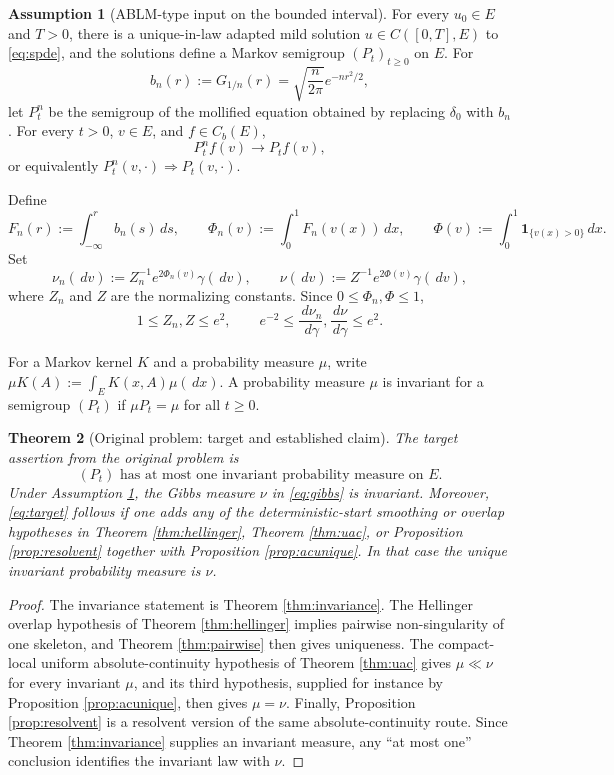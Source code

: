 \documentclass[12pt]{article}
\newcommand{\1}{\mathbf 1}
\newcommand{\dd}{\,d}
\theoremstyle{plain}
\newtheorem{theorem}{Theorem}[section]
\theoremstyle{definition}
\newtheorem{assumption}[theorem]{Assumption}
\theoremstyle{remark}
\numberwithin{equation}{section}
\begin{document}
\begin{assumption}[ABLM-type input on the bounded interval]\label{ass:ablm}
For every \(u_0\in E\) and \(T>0\), there is a unique-in-law adapted mild
solution \(u\in C([0,T],E)\) to \eqref{eq:spde}, and the solutions define a
Markov semigroup \((P_t)_{t\ge0}\) on \(E\).  For
\[
b_n(r):=G_{1/n}(r)=\sqrt{\frac n{2\pi}}e^{-nr^2/2},
\]
let \(P_t^n\) be the semigroup of the mollified equation obtained by replacing
\(\delta_0\) with \(b_n\).  For every \(t>0\), \(v\in E\), and \(f\in C_b(E)\),
\[
P_t^n f(v)\longrightarrow P_tf(v),
\]
or equivalently \(P_t^n(v,\cdot)\Rightarrow P_t(v,\cdot)\).
\end{assumption}

Define
\[
F_n(r):=\int_{-\infty}^r b_n(s)\dd s,\qquad
\Phi_n(v):=\int_0^1F_n(v(x))\dd x,\qquad
\Phi(v):=\int_0^1\1_{\{v(x)>0\}}\dd x.
\]
Set
\begin{equation}\label{eq:gibbs}
\nu_n(\dd v):=Z_n^{-1}e^{2\Phi_n(v)}\gamma(\dd v),
\qquad
\nu(\dd v):=Z^{-1}e^{2\Phi(v)}\gamma(\dd v),
\end{equation}
where \(Z_n\) and \(Z\) are the normalizing constants.  Since
\(0\le\Phi_n,\Phi\le1\),
\begin{equation}\label{eq:density-bounds}
1\le Z_n,Z\le e^2,
\qquad
e^{-2}\le \frac{\dd\nu_n}{\dd\gamma},\frac{\dd\nu}{\dd\gamma}\le e^2.
\end{equation}

For a Markov kernel \(K\) and a probability measure \(\mu\), write
\(\mu K(A):=\int_EK(x,A)\mu(\dd x)\).  A probability measure \(\mu\) is invariant
for a semigroup \((P_t)\) if \(\mu P_t=\mu\) for all \(t\ge0\).

\begin{theorem}[Original problem: target and established claim]\label{thm:headline}
The target assertion from the original problem is
\[
\tag{U}\label{eq:target}
\text{\((P_t)\) has at most one invariant probability measure on \(E\).}
\]
Under Assumption \ref{ass:ablm}, the Gibbs measure \(\nu\) in
\eqref{eq:gibbs} is invariant.  Moreover, \eqref{eq:target} follows if one adds
any of the deterministic-start smoothing or overlap hypotheses in Theorem
\ref{thm:hellinger}, Theorem \ref{thm:uac}, or Proposition
\ref{prop:resolvent} together with Proposition \ref{prop:acunique}.  In that
case the unique invariant probability measure is \(\nu\).
\end{theorem}

\begin{proof}
The invariance statement is Theorem \ref{thm:invariance}.  The Hellinger
overlap hypothesis of Theorem \ref{thm:hellinger} implies pairwise
non-singularity of one skeleton, and Theorem \ref{thm:pairwise} then gives
uniqueness.  The compact-local uniform absolute-continuity hypothesis of
Theorem \ref{thm:uac} gives \(\mu\ll\nu\) for every invariant \(\mu\), and its
third hypothesis, supplied for instance by Proposition \ref{prop:acunique},
then gives \(\mu=\nu\).  Finally, Proposition \ref{prop:resolvent} is a
resolvent version of the same absolute-continuity route.  Since
Theorem \ref{thm:invariance} supplies an invariant measure, any ``at most one''
conclusion identifies the invariant law with \(\nu\).
\end{proof}
\end{document}
